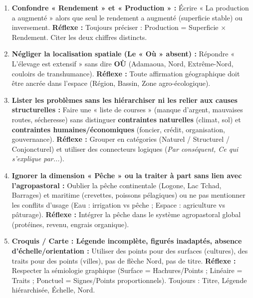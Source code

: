 \documentclass[11pt]{article}
\begin{document}
\begin{attention}
\begin{enumerate}
    \item \textbf{Confondre « Rendement » et « Production » :} Écrire « La production a augmenté » alors que seul le rendement a augmenté (superficie stable) ou inversement. \textbf{Réflexe :} Toujours préciser : Production = Superficie $\times$ Rendement. Citer les deux chiffres distincts.
    \item \textbf{Négliger la localisation spatiale (Le « Où » absent) :} Répondre « L'élevage est extensif » sans dire \textbf{OÙ} (Adamaoua, Nord, Extrême-Nord, couloirs de transhumance). \textbf{Réflexe :} Toute affirmation géographique doit être ancrée dans l'espace (Région, Bassin, Zone agro-écologique).
    \item \textbf{Lister les problèmes sans les hiérarchiser ni les relier aux causes structurelles :} Faire une « liste de courses » (manque d'argent, mauvaises routes, sécheresse) sans distinguer \textbf{contraintes naturelles} (climat, sol) et \textbf{contraintes humaines/économiques} (foncier, crédit, organisation, gouvernance). \textbf{Réflexe :} Grouper en catégories (Naturel / Structurel / Conjoncturel) et utiliser des connecteurs logiques (\emph{Par conséquent, Ce qui s'explique par...}).
    \item \textbf{Ignorer la dimension « Pêche » ou la traiter à part sans lien avec l'agropastoral :} Oublier la pêche continentale (Logone, Lac Tchad, Barrages) et maritime (crevettes, poissons pélagiques) ou ne pas mentionner les conflits d'usage (Eau : irrigation vs pêche ; Espace : agriculture vs pâturage). \textbf{Réflexe :} Intégrer la pêche dans le système agropastoral global (protéines, revenu, engrais organique).
    \item \textbf{Croquis / Carte : Légende incomplète, figurés inadaptés, absence d'échelle/orientation :} Utiliser des points pour des surfaces (cultures), des traits pour des points (villes), pas de flèche Nord, pas de titre. \textbf{Réflexe :} Respecter la sémiologie graphique (Surface = Hachures/Points ; Linéaire = Traits ; Ponctuel = Signes/Points proportionnels). Toujours : Titre, Légende hiérarchisée, Échelle, Nord.
\end{enumerate}
\end{attention}
\end{document}
